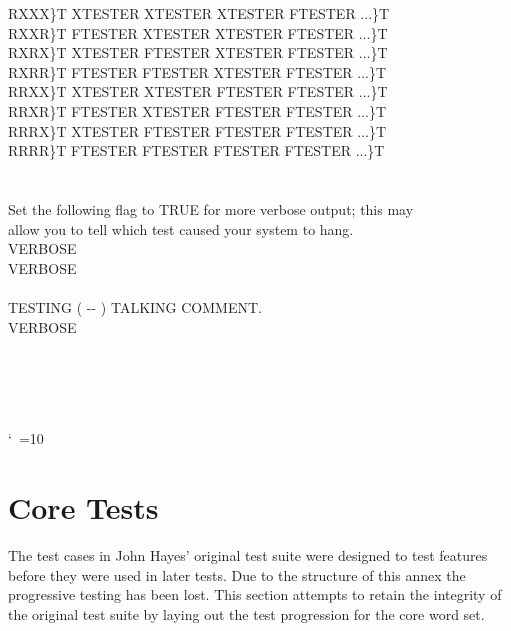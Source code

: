 \begin{tt}
\tab \word{:} RXXX\}T XTESTER XTESTER XTESTER FTESTER ...\}T \word{;} \\
\tab \word{:} RXXR\}T FTESTER XTESTER XTESTER FTESTER ...\}T \word{;} \\
\tab \word{:} RXRX\}T XTESTER FTESTER XTESTER FTESTER ...\}T \word{;} \\
\tab \word{:} RXRR\}T FTESTER FTESTER XTESTER FTESTER ...\}T \word{;} \\
\tab \word{:} RRXX\}T XTESTER XTESTER FTESTER FTESTER ...\}T \word{;} \\
\tab \word{:} RRXR\}T FTESTER XTESTER FTESTER FTESTER ...\}T \word{;} \\
\tab \word{:} RRRX\}T XTESTER FTESTER FTESTER FTESTER ...\}T \word{;} \\
\tab \word{:} RRRR\}T FTESTER FTESTER FTESTER FTESTER ...\}T \word{;} \\
\word[tools]{[THEN]} \\
\\
 Set the following flag to TRUE for more verbose output; this may \\
 allow you to tell which test caused your system to hang. \\
 VERBOSE \\\mbox{}
   VERBOSE \word{!} \\
 \\
\word{:} TESTING	 ( -{}- ) TALKING COMMENT. \\
\tab {} VERBOSE  \\
\tab {}       \word{!} \\
\tab {}  \word{!}  \\
\tab {} \word{;} \\
\\
 \word{!}
\end{tt}
\nonfrenchspacing
\catcode`\ =10

\section{Core Tests}
\label{test:core}

The test cases in John Hayes' original test suite were designed to
test features before they were used in later tests.  Due to the
structure of this annex the progressive testing has been lost.  This
section attempts to retain the integrity of the original test suite
by laying out the test progression for the core word set.

